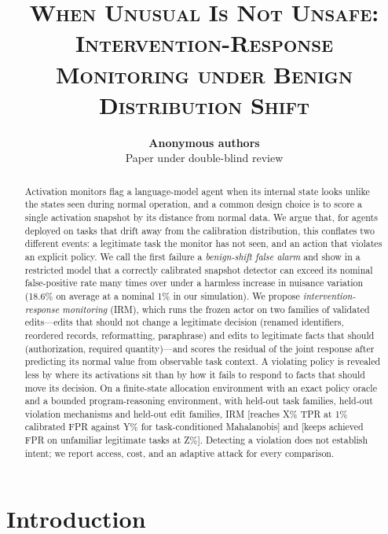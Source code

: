 \documentclass[10pt]{article}
\title{\textsc{When Unusual Is Not Unsafe: Intervention-Response Monitoring under Benign Distribution Shift}}
\author{\textbf{Anonymous authors}\\Paper under double-blind review}
\date{}
\newcommand{\TBD}[1]{\textcolor{BrickRed}{[#1]}}
\newcommand{\method}{\textsc{IRM}}
\begin{document}
\maketitle
\thispagestyle{fancy}

\begin{abstract}
Activation monitors flag a language-model agent when its internal state looks unlike the states seen
during normal operation, and a common design choice is to score a single activation snapshot by its
distance from normal data. We argue that, for agents deployed on tasks that drift away from the
calibration distribution, this conflates two different events: a legitimate task the monitor has not
seen, and an action that violates an explicit policy. We call the first failure a \emph{benign-shift
false alarm} and show in a restricted model that a correctly calibrated snapshot detector can exceed
its nominal false-positive rate many times over under a harmless increase in nuisance variation
(18.6\% on average at a nominal 1\% in our simulation). We propose \emph{intervention-response monitoring}
(\method), which runs the frozen actor on two families of validated edits---edits that should not
change a legitimate decision (renamed identifiers, reordered records, reformatting, paraphrase) and
edits to legitimate facts that should (authorization, required quantity)---and scores the residual of
the joint response after predicting its normal value from observable task context. A violating
policy is revealed less by where its activations sit than by how it fails to respond to facts that
should move its decision. On a finite-state allocation environment with an exact policy oracle and a
bounded program-reasoning environment, with held-out task families, held-out violation mechanisms
and held-out edit families, \method{} \TBD{reaches X\% TPR at 1\% calibrated FPR against Y\% for
task-conditioned Mahalanobis} and \TBD{keeps achieved FPR on unfamiliar legitimate tasks at Z\%}.
Detecting a violation does not establish intent; we report access, cost, and an adaptive attack for
every comparison.
\end{abstract}

\section{Introduction}
\label{sec:intro}
\end{document}
